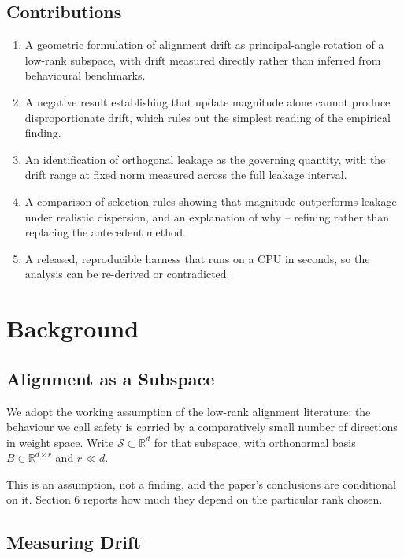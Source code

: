 \documentclass{article}
\begin{document}
\subsection{Contributions}


\begin{enumerate}
  \item A geometric formulation of alignment drift as principal-angle rotation of a low-rank subspace, with drift measured directly rather than inferred from behavioural benchmarks.
  \item A negative result establishing that update magnitude alone cannot produce disproportionate drift, which rules out the simplest reading of the empirical finding.
  \item An identification of orthogonal leakage as the governing quantity, with the drift range at fixed norm measured across the full leakage interval.
  \item A comparison of selection rules showing that magnitude outperforms leakage under realistic dispersion, and an explanation of why -- refining rather than replacing the antecedent method.
  \item A released, reproducible harness that runs on a CPU in seconds, so the analysis can be re-derived or contradicted.
\end{enumerate}




\section{Background}



\subsection{Alignment as a Subspace}


We adopt the working assumption of the low-rank alignment literature: the behaviour we call safety is carried by a comparatively small number of directions in weight space. Write $\mathcal{S} \subset \mathbb{R}^{d}$ for that subspace, with orthonormal basis $B \in \mathbb{R}^{d \times r}$ and $r \ll d$.

This is an assumption, not a finding, and the paper's conclusions are conditional on it. Section 6 reports how much they depend on the particular rank chosen.


\subsection{Measuring Drift}
\end{document}
